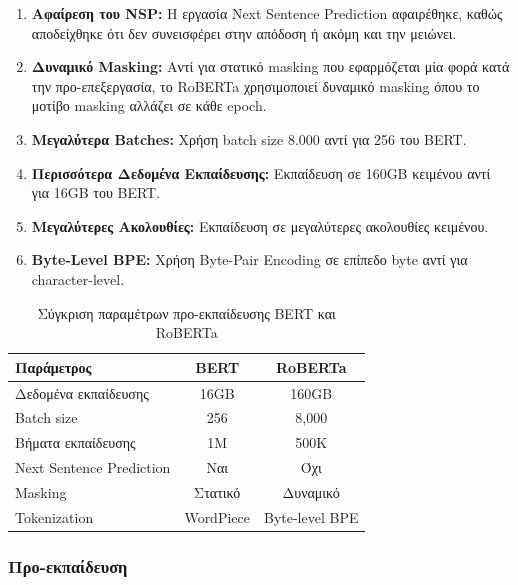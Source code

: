\documentclass[a4paper,11pt,oneside,openany]{ioniothesis}
\begin{document}
\begin{enumerate}
    \item \textbf{Αφαίρεση του NSP:} Η εργασία Next Sentence Prediction αφαιρέθηκε, καθώς αποδείχθηκε ότι δεν συνεισφέρει στην απόδοση ή ακόμη και την μειώνει.
    
    \item \textbf{Δυναμικό Masking:} Αντί για στατικό masking που εφαρμόζεται μία φορά κατά την προ-επεξεργασία, το RoBERTa χρησιμοποιεί δυναμικό masking όπου το μοτίβο masking αλλάζει σε κάθε epoch.
    
    \item \textbf{Μεγαλύτερα Batches:} Χρήση batch size 8.000 αντί για 256 του BERT.
    
    \item \textbf{Περισσότερα Δεδομένα Εκπαίδευσης:} Εκπαίδευση σε 160GB κειμένου αντί για 16GB του BERT.
    
    \item \textbf{Μεγαλύτερες Ακολουθίες:} Εκπαίδευση σε μεγαλύτερες ακολουθίες κειμένου.
    
    \item \textbf{Byte-Level BPE:} Χρήση Byte-Pair Encoding σε επίπεδο byte αντί για character-level.
\end{enumerate}

\begin{table}[htbp]
\centering
\caption{Σύγκριση παραμέτρων προ-εκπαίδευσης BERT και RoBERTa}
\label{tab:bert_roberta_comparison}
\begin{tabular}{@{}lcc@{}}
\toprule
\textbf{Παράμετρος} & \textbf{BERT} & \textbf{RoBERTa} \\
\midrule
Δεδομένα εκπαίδευσης & 16GB & 160GB \\
Batch size & 256 & 8,000 \\
Βήματα εκπαίδευσης & 1M & 500K \\
Next Sentence Prediction & Ναι & Όχι \\
Masking & Στατικό & Δυναμικό \\
Tokenization & WordPiece & Byte-level BPE \\
\bottomrule
\end{tabular}
\end{table}




\subsubsection{Προ-εκπαίδευση}
\label{sec:Προ-εκπαίδευση RoBERTa}
\end{document}
